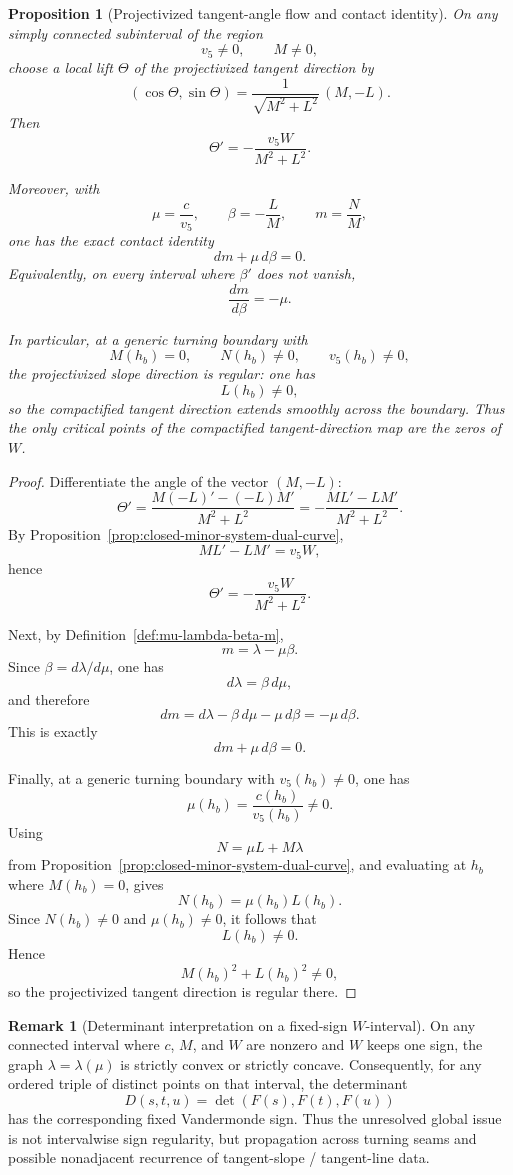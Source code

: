 \documentclass[11pt,a4paper]{amsart}
\theoremstyle{plain}
\newtheorem{proposition}[theorem]{Proposition}
\theoremstyle{definition}
\newtheorem{remark}[theorem]{Remark}
\begin{document}
\begin{proposition}[Projectivized tangent-angle flow and contact identity]
\label{prop:projectivized-angle-contact-identity}
On any simply connected subinterval of the region
\[
v_5\neq 0,
\qquad
M\neq 0,
\]
choose a local lift $\Theta$ of the projectivized tangent direction by
\[
(\cos\Theta,\sin\Theta)
=
\frac{1}{\sqrt{M^2+L^2}}\,(M,-L).
\]
Then
\[
\Theta'=-\frac{v_5W}{M^2+L^2}.
\]

Moreover, with
\[
\mu=\frac{c}{v_5},
\qquad
\beta=-\frac{L}{M},
\qquad
m=\frac{N}{M},
\]
one has the exact contact identity
\[
dm+\mu\,d\beta=0.
\]
Equivalently, on every interval where $\beta'$ does not vanish,
\[
\frac{dm}{d\beta}=-\mu.
\]

In particular, at a generic turning boundary with
\[
M(h_b)=0,
\qquad
N(h_b)\neq 0,
\qquad
v_5(h_b)\neq 0,
\]
the projectivized slope direction is regular: one has
\[
L(h_b)\neq 0,
\]
so the compactified tangent direction extends smoothly across the boundary.
Thus the only critical points of the compactified tangent-direction map are the
zeros of $W$.
\end{proposition}

\begin{proof}
Differentiate the angle of the vector $(M,-L)$:
\[
\Theta'
=
\frac{M(-L)'-(-L)M'}{M^2+L^2}
=
-\frac{ML'-LM'}{M^2+L^2}.
\]
By Proposition~\ref{prop:closed-minor-system-dual-curve},
\[
ML'-LM'=v_5W,
\]
hence
\[
\Theta'=-\frac{v_5W}{M^2+L^2}.
\]

Next, by Definition~\ref{def:mu-lambda-beta-m},
\[
m=\lambda-\mu\beta.
\]
Since $\beta=d\lambda/d\mu$, one has
\[
d\lambda=\beta\,d\mu,
\]
and therefore
\[
dm=d\lambda-\beta\,d\mu-\mu\,d\beta=-\mu\,d\beta.
\]
This is exactly
\[
dm+\mu\,d\beta=0.
\]

Finally, at a generic turning boundary with $v_5(h_b)\neq 0$, one has
\[
\mu(h_b)=\frac{c(h_b)}{v_5(h_b)}\neq 0.
\]
Using
\[
N=\mu L+M\lambda
\]
from Proposition~\ref{prop:closed-minor-system-dual-curve}, and evaluating at
$h_b$ where $M(h_b)=0$, gives
\[
N(h_b)=\mu(h_b)L(h_b).
\]
Since $N(h_b)\neq 0$ and $\mu(h_b)\neq 0$, it follows that
\[
L(h_b)\neq 0.
\]
Hence
\[
M(h_b)^2+L(h_b)^2\neq 0,
\]
so the projectivized tangent direction is regular there.
\end{proof}

\begin{remark}[Determinant interpretation on a fixed-sign $W$-interval]
\label{rem:determinant-interpretation-fixed-sign-W}
On any connected interval where $c$, $M$, and $W$ are nonzero and $W$
keeps one sign, the graph $\lambda=\lambda(\mu)$ is strictly convex or
strictly concave. Consequently, for any ordered triple of distinct points on
that interval, the determinant
\[
D(s,t,u)=\det(F(s),F(t),F(u))
\]
has the corresponding fixed Vandermonde sign. Thus the unresolved global issue
is not intervalwise sign regularity, but propagation across turning seams and
possible nonadjacent recurrence of tangent-slope / tangent-line data.
\end{remark}
\end{document}
